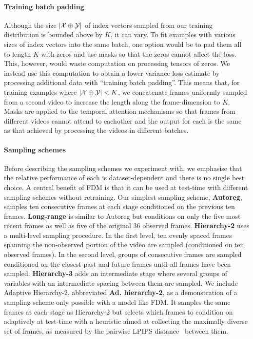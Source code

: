\paragraph{Training batch padding}
Although the size $|\mathcal{X}\oplus\mathcal{Y}|$ of index vectors sampled from our training distribution is bounded above by $K$, it can vary. To fit examples with various sizes of index vectors into the same batch, one option would be to pad them all to length $K$ with zeros and use masks so that the zeros cannot affect the loss. This, however, would waste computation on processing tensors of zeros.
%
We instead use this computation to obtain a lower-variance loss estimate by processing additional data with ``training batch padding''.
%
This means that, for training examples where $|\mathcal{X}\oplus\mathcal{Y}| < K$, we concatenate frames uniformly sampled from a second video to increase the length along the frame-dimension to $K$. Masks are applied to the temporal attention mechanisms so that frames from different videos cannot attend to eachother and the output for each is the same as that achieved by processing the videos in different batches.

\paragraph{Sampling schemes}
Before describing the sampling schemes we experiment with, we emphasise that the relative performance of each is dataset-dependent and there is no single best choice. A central benefit of FDM is that it can be used at test-time with different sampling schemes without retraining. Our simplest sampling scheme, \textbf{Autoreg}, samples ten consecutive frames at each stage conditioned on the previous ten frames. \textbf{Long-range} is similar to Autoreg but conditions on only the five most recent frames as well as five of the original 36 observed frames. \textbf{Hierarchy-2} uses a multi-level sampling procedure. In the first level, ten evenly spaced frames spanning the non-observed portion of the video are sampled (conditioned on ten observed frames). In the second level, groups of consecutive frames are sampled conditioned on the closest past and future frames until all frames have been sampled. \textbf{Hierarchy-3} adds an intermediate stage where several groups of variables with an intermediate spacing between them are sampled. We include Adaptive Hierarchy-2, abbreviated \textbf{Ad. hierarchy-2}, as a demonstration of a sampling scheme only possible with a model like FDM. It samples the same frames at each stage as Hierarchy-2 but selects which frames to condition on adaptively at test-time with a heuristic aimed at collecting the maximally diverse set of frames, as measured by the pairwise LPIPS distance~\cite{zhang2018unreasonable} between them.

